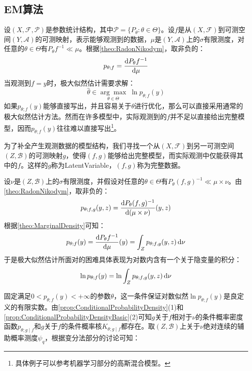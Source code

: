 \subsection{EM算法}
设$(X,\mathscr{F},\mathscr{P})$是参数统计结构，其中$\mathscr{P}=\{P_{\theta}:\theta\in\Theta\}$。设$f$是从$(X,\mathscr{F})$到可测空间$(Y,\mathscr{A})$的可测映射，表示能够观测到的数据，$\mu$是$(Y,\mathscr{A})$上的$\sigma$有限测度，对任意的$\theta\in\Theta$有$P_{\theta}f^{-1}\ll\mu$。根据\cref{theo:RadonNikodym}，取非负的：
\begin{equation*}
	p_{\theta;f}=\dfrac{\mathop{}\!\mathrm{d} P_{\theta}f^{-1}}{\mathop{}\!\mathrm{d}\mu}
\end{equation*}
当观测到$f=y$时，极大似然估计需要求解：
\begin{equation*}
	\hat{\theta}\in\underset{\theta\in\Theta}{\arg\max}\;\ln p_{\theta;f}(y)
\end{equation*}
如果$p_{\theta;f}(y)$能够直接写出，并且容易关于$\theta$进行优化，那么可以直接采用通常的极大似然估计方法。然而在许多模型中，实际观测到的$f$并不足以直接给出完整模型，因而$p_{\theta;f}(y)$往往难以直接写出\footnote{具体例子可以参考机器学习部分的高斯混合模型。}。\par
为了补全产生观测数据的模型结构，我们寻找一个从$(X,\mathscr{F})$到另一可测空间$(Z,\mathscr{B})$的可测映射$g$，使得$(f,g)$能够给出完整模型，而实际观测中仅能获得其中的$f$。这样的$g$称为\gls{LatentVariable}，$(f,g)$称为完整数据。\par
设$\nu$是$(Z,\mathscr{B})$上的$\sigma$有限测度，并假设对任意的$\theta\in\Theta$有$P_{\theta}(f,g)^{-1}\ll\mu\times\nu$。由\cref{theo:RadonNikodym}，取非负的：
\begin{equation*}
	p_{\theta;f,g}(y,z)=\frac{\mathop{}\!\mathrm{d} P_{\theta}(f,g)^{-1}}{\mathop{}\!\mathrm{d}(\mu\times\nu)}(y,z)
\end{equation*}
根据\cref{theo:MarginalDensity}可知：
\begin{equation*}
	p_{\theta;f}(y)=\frac{\mathop{}\!\mathrm{d} P_{\theta}f^{-1}}{\mathop{}\!\mathrm{d}\mu}(y)=\int_{Z}p_{\theta;f,g}(y,z)\mathop{}\!\mathrm{d}\nu
\end{equation*}
于是极大似然估计所面对的困难具体表现为对数内含有一个关于隐变量的积分：
\begin{equation*}
	\ln p_{\theta;f}(y)=\ln\int_{Z}p_{\theta;f,g}(y,z)\mathop{}\!\mathrm{d}\nu
\end{equation*}\par
固定满足$0<p_{\theta;f}(y)<+\infty$的参数$\theta$，这一条件保证对数似然$\ln p_{\theta;f}(y)$是良定义的有限实数。由\cref{prop:ConditionalProbabilityDensity}(1)和\cref{prop:ConditionalProbabilityDensityBasic}(2)可知$g$关于$f$相对于$\nu$的条件概率密度函数$p_{\theta;g\mid f}$和$g$关于$f$的条件概率核$K_{\theta;g\mid f}$都存在。取$(Z,\mathscr{B})$上关于$\nu$绝对连续的辅助概率测度$\psi_q$，根据变分法部分的讨论可知：
